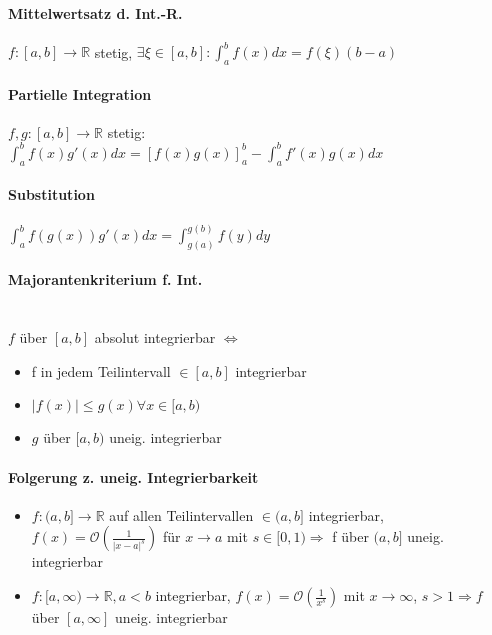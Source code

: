\documentclass[paper=a3,paper=landscape, fontsize=9pt, DIV=30]{scrartcl}
\newcommand{\real}{{\mathbb{R}}}
\newcommand{\laO}{\mathcal{O}}
\begin{document}
\begin{multicols*}{4}
  \paragraph{Mittelwertsatz d. Int.-R.}
  $f:[a,b] \rightarrow \real$ stetig, $\exists \xi \in [a,b]: \int_{a}^{b}f(x)dx=f(\xi)(b-a)$


  \paragraph{Partielle Integration}
  $f,g: [a,b] \rightarrow \real$ stetig: $\int_{a}^{b}f(x)g'(x)dx=[f(x)g(x)]_a^b-\int_{a}^{b}f'(x)g(x) dx$


  \paragraph{Substitution}
  $\int_{a}^{b}f(g(x))g'(x)dx=\int_{g(a)}^{g(b)}f(y)dy$


  \paragraph{Majorantenkriterium f. Int.}\hspace{0pt} \\
  $f$ über $[a,b]$ absolut integrierbar $\Leftrightarrow$
  \begin{itemize}
  \item f in jedem Teilintervall $\in [a,b]$ integrierbar
  \item $\lvert f(x) \rvert \leq g(x) \forall x \in [a,b)$
  \item $g$ über $[a,b)$ uneig. integrierbar
  \end{itemize}

	\paragraph{Folgerung z. uneig. Integrierbarkeit}
	\begin{itemize}
		\item $f: (a,b] \rightarrow \real$ auf allen Teilintervallen $\in (a,b]$ integrierbar, $f(x)=\laO(\frac{1}{\lvert x-a \rvert ^s})$ für $x \rightarrow a$ mit $s \in [0,1) \Rightarrow$ f über $(a,b]$ uneig. integrierbar
		\item $f: [a,\infty) \rightarrow \real, a<b$ integrierbar, $f(x)=\laO(\frac{1}{x^s})$ mit $x \rightarrow \infty$, $s > 1 \Rightarrow f$ über $[a,\infty]$ uneig. integrierbar
	\end{itemize}



\end{multicols*}
\end{document}
